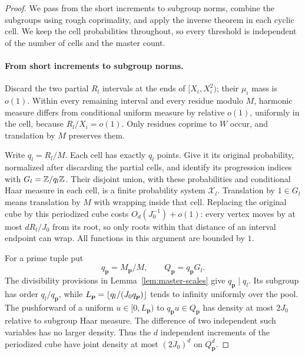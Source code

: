 \begin{proof}
We pass from the short increments to subgroup norms, combine the
subgroups using rough coprimality, and apply the inverse theorem in
each cyclic cell.  We keep the cell probabilities throughout, so every
threshold is independent of the number of cells and the master count.

\paragraph{From short increments to subgroup norms.}
Discard the two partial $R_l$ intervals at the ends of
$[X_i,X_i^2)$; their $\mu_i$ mass is $o(1)$.  Within every remaining
interval and every residue modulo $M$, harmonic measure differs
from conditional uniform measure by relative $o(1)$, uniformly in
the cell, because $R_l/X_i=o(1)$.  Only residues coprime to $W$
occur, and translation by $M$ preserves them.

Write $q_l=R_l/M$.  Each cell has exactly $q_l$ points.  Give it its
original probability, normalized after discarding the partial
cells, and identify its progression indices with
$G_l=\mathbb Z/q_l\mathbb Z$.  Their disjoint union, with these probabilities and
conditional Haar measure in each cell, is a finite probability
system $\mathcal X_l$.  Translation by $1\in G_l$ means translation
by $M$ with wrapping inside that cell.  Replacing the original cube
by this periodized cube costs $O_d(J_0^{-1})+o(1)$: every vertex
moves by at most $dR_l/J_0$ from its root, so only roots within that
distance of an interval endpoint can wrap.  All functions in this
argument are bounded by $1$.

For a prime tuple put
\[
 q_{\boldsymbol p}=M_{\boldsymbol p}/M,
 \qquad Q_{\boldsymbol p}=q_{\boldsymbol p}G_l.
\]
The divisibility provisions in Lemma~\ref{lem:master-scales} give
$q_{\boldsymbol p}\mid q_l$.  Its subgroup has order
$q_l/q_{\boldsymbol p}$, while
$L_{\boldsymbol p}=\lfloor q_l/(J_0q_{\boldsymbol p})\rfloor$ tends to
infinity uniformly over the pool.  The pushforward of a uniform
$u\in[0,L_{\boldsymbol p})$ to $q_{\boldsymbol p}u\in Q_{\boldsymbol p}$
has density at most $2J_0$ relative to subgroup Haar measure.
The difference of two independent such variables has no larger
density.  Thus the $d$ independent increments of the periodized
cube have joint density at most $(2J_0)^d$ on
$Q_{\boldsymbol p}^d$.


\end{proof}
